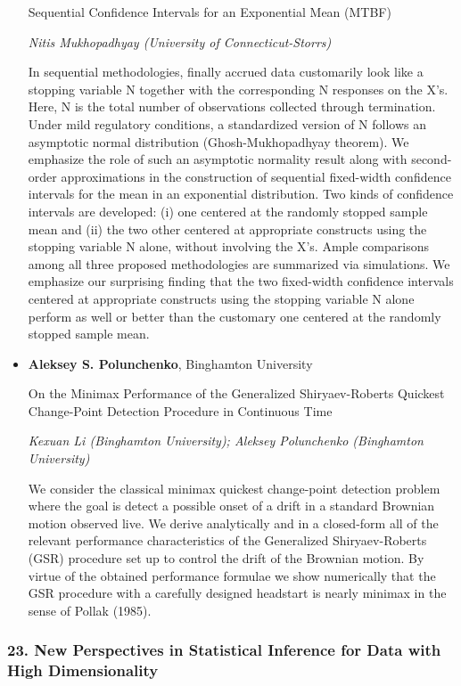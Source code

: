 \begin{itemize}
Sequential Confidence Intervals for an Exponential Mean (MTBF)

\emph{\footnotesize Nitis Mukhopadhyay (University of Connecticut-Storrs)}

In sequential methodologies, finally accrued data customarily look like a stopping variable N together with the corresponding N responses on the X’s. Here, N is the total number of observations collected through termination. Under mild regulatory conditions, a standardized version of N follows an asymptotic normal distribution (Ghosh-Mukhopadhyay theorem). We emphasize the role of such an asymptotic normality result along with second-order approximations in the construction of sequential fixed-width confidence intervals for the mean in an exponential distribution. Two kinds of confidence intervals are developed: (i) one centered at the randomly stopped sample mean and (ii) the two other centered at appropriate constructs using the stopping variable N alone, without involving the X’s. Ample comparisons among all three proposed methodologies are summarized via simulations. We emphasize our surprising finding that the two fixed-width confidence intervals centered at appropriate constructs using the stopping variable N alone perform as well or better than the customary one centered at the randomly stopped sample mean.

\item \textbf{Aleksey S. Polunchenko}, Binghamton University

On the Minimax Performance of the Generalized Shiryaev-Roberts Quickest Change-Point Detection Procedure in Continuous Time

\emph{\footnotesize Kexuan Li (Binghamton University); Aleksey Polunchenko (Binghamton University)}

We consider the classical minimax quickest change-point detection problem where the goal is detect a possible onset of a drift in a standard Brownian motion observed live. We derive analytically and in a closed-form all of the relevant performance characteristics of the Generalized Shiryaev-Roberts (GSR) procedure set up to control the drift of the Brownian motion. By virtue of the obtained performance formulae we show numerically that the GSR procedure with a carefully designed headstart is nearly minimax in the sense of Pollak (1985).

\end{itemize}

\subsubsection*{23. New Perspectives in Statistical Inference for Data with High Dimensionality}

